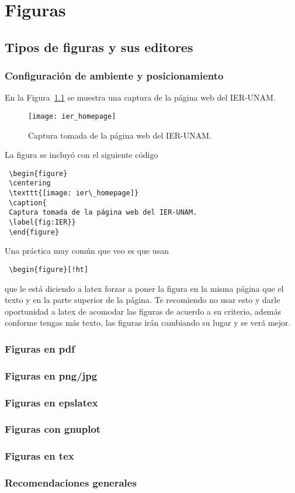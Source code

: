 \chapter{Figuras}
\label{chap:figuras}


 
 
 \section{Tipos de figuras y sus editores}
\subsection{Configuración de ambiente y posicionamiento}
 En la Figura~\ref{fig:IER} se muestra una captura de la página web del IER-UNAM.
 \begin{figure}
 \centering
 \texttt{[image: ier\_homepage]}
 \caption{	
 Captura tomada de la página web del IER-UNAM.
 \label{fig:IER}
 }
 \end{figure}
 
 La figura se incluyó con el siguiente código
 \begin{verbatim}
 \begin{figure}
 \centering
 \texttt{[image: ier\_homepage]}
 \caption{	
 Captura tomada de la página web del IER-UNAM.
 \label{fig:IER}}
 \end{figure}
 \end{verbatim}
 
Una práctica muy común que veo es que usan 
 \begin{verbatim}
 \begin{figure}[!ht]
 \end{verbatim}
 que le está diciendo a latex forzar a poner la figura en la misma página que el texto y en la parte superior de la página. Te recomiendo no usar esto y darle oportunidad a latex de acomodar las figuras de acuerdo a su criterio, además conforme tengas más texto, las figuras irán cambiando su lugar y se verá mejor.
\subsection{Figuras en pdf}
\subsection{Figuras en png/jpg}
\subsection{Figuras en epslatex}
\subsection{Figuras con gnuplot}
\subsection{Figuras en tex}
\subsection{Recomendaciones generales}